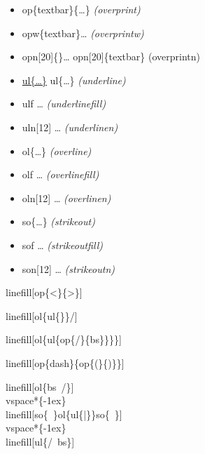 \documentclass[english,12pt,openany,letterpaper]{book}
\begin{document}
\begin{itemize}
	\item {} \tab \bs op\{\bs textbar\}\{\ldots\} \tab \textit{(\bs overprint)}
	\item \opw{\textbar}\bs opw\{\bs textbar\}\ldots {} \textit{(\bs overprintw)}
	\item \opn[20]{\textbar}\bs opn[20]\{\textbar\}\ldots {} \bs opn[20]\{\bs textbar\} \tab (\bs overprintn)
	\item \ul{\bs ul\{\ldots\}} \tab\bs ul\{\ldots\} \tab \textit{(\bs underline)}
	\item \ulf \bs ulf \ldots {} \textit{(\bs underlinefill)}
	\item \uln[16]\bs uln[12] \ldots {} \textit{(\bs underlinen)}
	\item {} \tab\bs ol\{\ldots\} \tab \textit{(\bs overline)}
	\item \olf \bs olf \ldots {} \textit{(\bs overlinefill)}
	\item \oln[16]\bs oln[12] \ldots {} \textit{(\bs overlinen)}
	\item {} \tab\bs so\{\ldots\} \tab \textit{(\bs strikeout)}
	\item \sof \bs sof \ldots {} \textit{(\bs strikeoutfill)}
	\item \son[16]\bs son[12] \ldots {} \textit{(\bs strikeoutn)}
\end{itemize}

\skipline

\bs linefill[\bs op\{<\}\{>\}]

\linefill[\op{<}{>}]

\skipline

\bs linefill[\bs ol\{\bs ul\{\tld\}\}/]

\linefill[\ol{\ul{~}}/]

\skipline

\bs linefill[\bs ol\{\bs ul\{\bs op\{/\}\{\bs bs\}\}\}\}]

\linefill[{\ol{\ul{\op{/}{\bs}}}}]

\skipline

\bs linefill[\bs op\{\bs dash\}\{\bs op\{(\}\{)\}\}]

\linefill[\op{\dash}{\op{(}{)}}]

\skipline

\bs linefill[\bs ol\{\bs bs\bs\ /\}]\\
\bs vspace*\{-1ex\}\\
\bs linefill[\bs so\{\bs\ \}\bs ol\{\bs ul\{|\}\}\bs so\{\bs\ \}]\\
\bs vspace*\{-1ex\}\\
\bs linefill[\bs ul\{/\bs \ \bs bs\}]\\
\end{document}
